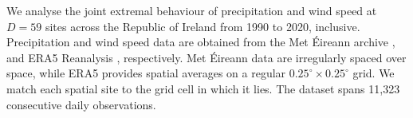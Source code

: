 \documentclass[12pt,compact]{article}
\begin{document}
We analyse the joint extremal behaviour of precipitation and wind speed at $D=59$ sites across the Republic of Ireland from 1990 to 2020, inclusive. 
Precipitation and wind speed data are obtained from the Met Éireann archive \citep{metHistoricalData}, and ERA5 Reanalysis \citep{Hersbach2020}, respectively. %
Met Éireann data are irregularly spaced over space, while ERA5 provides spatial averages on a regular $0.25^{\circ} \times 0.25^{\circ}$ grid.
We match each spatial site to the grid cell in which it lies. 
The dataset spans 11,323 consecutive daily observations.%
\end{document}
